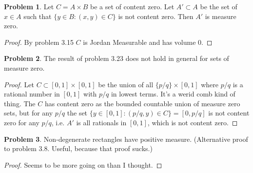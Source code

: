 \documentclass[20pt]{article}
\theoremstyle{plain}
\theoremstyle{definition}
\newtheorem*{problem}{Problem}
\begin{document}
\begin{problem}{3.23}
  Let $C = A \times B$ be a set of content zero.
  Let $A' \subset A$ be the set of $x \in A$ such that
  $\{ y \in B: (x, y) \in C \}$ is not content zero.
  Then $A'$ is measure zero.
\end{problem}
\begin{proof}
  By problem 3.15 $C$ is Jordan Measurable and has volume $0$.
\end{proof}



\begin{problem}{3.24}
  The result of problem 3.23 does not hold in general for sets of measure zero.
\end{problem}

\begin{proof}
  Let $C\subset [0,1] \times [0,1]$ be the union of all
  $\{ p/q \} \times [0, 1]$ where $p/q$ is a rational number in $[0, 1]$ with
  $p/q$ in lowest terms. It's a werid comb kind of thing.
  The $C$ has content zero as the bounded countable union of measure zero sets, but
  for any $p/q$ the set $\{ y \in [0, 1]: (p/q, y) \in C \} = [0, p/q]$
  is not content zero for any $p/q$, i.e. $A'$ is all rationals in $[0,1]$, which
  is not content zero.
\end{proof}



\begin{problem}{3.25}
  Non-degenerate rectangles have positive measure.
  (Alternative proof to problem 3.8.  Useful, because that proof sucks.)
\end{problem}

\begin{proof}
  \color{ForestGreen}
  Seems to be more going on than I thought.
\end{proof}
\end{document}
